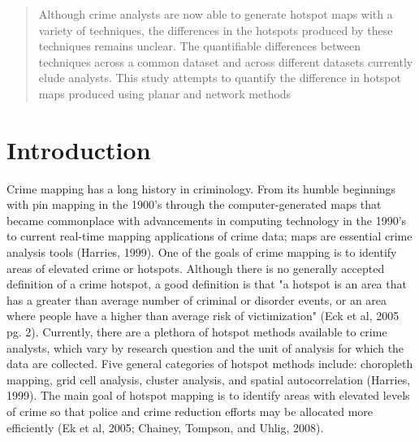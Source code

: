\documentclass[12pt, letterpaper]{article}
\begin{document}
\maketitle{}
\newpage

\begin{abstract}
Although crime analysts are now able to generate hotspot maps with a variety of techniques, the differences in the hotspots produced by these techniques remains unclear. The quantifiable differences between techniques across a common dataset and across different datasets currently elude analysts. This study attempts to quantify the difference in hotspot maps produced using planar and network methods

\end{abstract}
\newpage

\section{Introduction}

Crime mapping has a long history in criminology. From its humble beginnings  with pin mapping in the 1900's through the computer-generated maps that became commonplace with advancements in computing technology in the 1990's to current real-time mapping applications of crime data; maps are essential crime analysis tools (Harries, 1999). One of the goals of crime mapping is to identify areas of elevated crime or hotspots. Although there is no generally accepted definition of a crime hotspot, a good definition is that "a hotspot is an area that has a greater than average number of criminal or disorder events, or an area where people have a higher than average risk of victimization" (Eck et al, 2005 pg. 2). Currently, there are a plethora of hotspot methods available to crime analysts, which vary by research question and the unit of analysis for which the data are collected. Five general categories of hotspot methods include: choropleth mapping, grid cell analysis, cluster analysis, and spatial autocorrelation (Harries, 1999). The main goal of hotspot mapping is to identify areas with elevated levels of crime so that police and crime reduction efforts may be allocated more efficiently (Ek et al, 2005; Chainey, Tompson, and Uhlig, 2008). 
\end{document}
